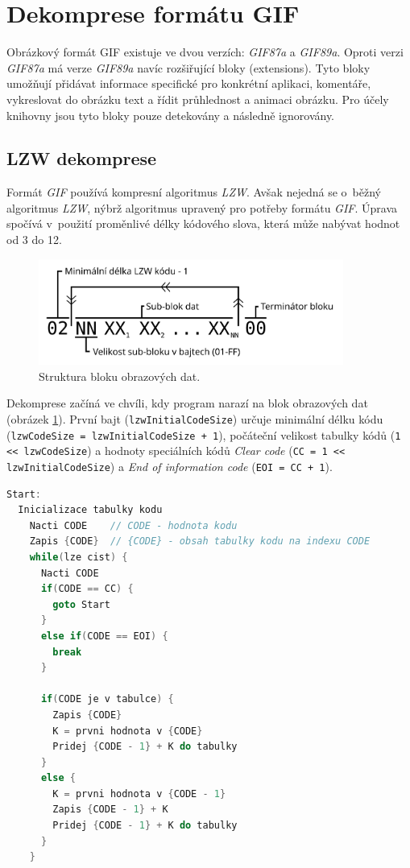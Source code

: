 \documentclass[12pt,a4paper,notitlepage,final]{article}
\begin{document}
\section{Dekomprese formátu GIF}

Obrázkový formát GIF existuje ve dvou verzích: \textit{GIF87a} a \textit{GIF89a}.
Oproti verzi \textit{GIF87a} má verze \textit{GIF89a} navíc rozšiřující bloky
(extensions). Tyto bloky umožňují přidávat informace specifické pro konkrétní
aplikaci, komentáře, vykreslovat do obrázku text a řídit průhlednost a animaci
obrázku. Pro účely knihovny jsou tyto bloky pouze detekovány a následně
ignorovány.

\subsection{LZW dekomprese}

Formát \textit{GIF} používá kompresní algoritmus \textit{LZW}. Avšak nejedná
se o~běžný algoritmus \textit{LZW}, nýbrž algoritmus upravený pro potřeby
formátu \textit{GIF}. Úprava spočívá v~použití proměnlivé délky kódového slova,
která může nabývat hodnot od 3 do 12.

\begin{figure}
  \centering
  \includegraphics[width=10cm, keepaspectratio]{img/image-data}
  \caption{Struktura bloku obrazových dat.}
  \label{img:image-data}
\end{figure}

Dekomprese začíná ve chvíli, kdy program narazí na blok obrazových dat
(obrázek \ref{img:image-data}). První bajt (\texttt{lzwInitialCodeSize})
určuje minimální délku kódu \\ (\texttt{lzwCodeSize = lzwInitialCodeSize + 1}),
počáteční velikost tabulky kódů (\texttt{1 <{}< lzwCodeSize}) a hodnoty
speciálních kódů \textit{Clear code} (\texttt{CC = 1 <{}< lzwInitialCodeSize}) a
\textit{End of information code} (\texttt{EOI = CC + 1}).

\begin{lstlisting}[language=C,
  caption={Pseudokód pro dekódování LZW dat.},
  label={lst:lzw_decode},
  ]
  Start:
  Inicializace tabulky kodu
    Nacti CODE    // CODE - hodnota kodu
    Zapis {CODE}  // {CODE} - obsah tabulky kodu na indexu CODE
    while(lze cist) {
      Nacti CODE
      if(CODE == CC) {
        goto Start
      }
      else if(CODE == EOI) {
        break
      }

      if(CODE je v tabulce) {
        Zapis {CODE}
        K = prvni hodnota v {CODE}
        Pridej {CODE - 1} + K do tabulky
      }
      else {
        K = prvni hodnota v {CODE - 1}
        Zapis {CODE - 1} + K
        Pridej {CODE - 1} + K do tabulky
      }
    }
\end{lstlisting}
\end{document}
